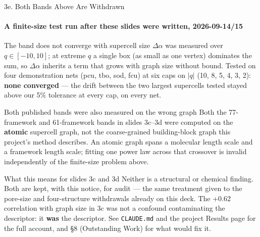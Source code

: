 \documentclass[aspectratio=169, 11pt]{beamer}
\begin{document}
\begin{frame}{3e. Both Bands Above Are Withdrawn}
\framesubtitle{A finite-size test run after these slides were written, 2026-09-14/15}
\begin{block}{\footnotesize The band does not converge with supercell size}
\scriptsize
$\Delta\alpha$ was measured over $q\in[-10,10]$; at extreme $q$ a single box (as small as one
vertex) dominates the sum, so $\Delta\alpha$ inherits a term that grows with graph size without
bound. Tested on four demonstration nets (pcu, tbo, sod, fcu) at six caps on $|q|$
(10, 8, 5, 4, 3, 2): \textbf{none converged} --- the drift between the two largest supercells
tested stayed above our 5\% tolerance at every cap, on every net.
\end{block}
\begin{block}{\footnotesize Both published bands were also measured on the wrong graph}
\scriptsize
Both the 77-framework and 61-framework bands in slides 3c--3d were computed on the
\textbf{atomic} supercell graph, not the coarse-grained building-block graph this project's
method describes. An atomic graph spans a molecular length scale and a framework length scale;
fitting one power law across that crossover is invalid independently of the finite-size problem
above.
\end{block}
\begin{block}{\footnotesize What this means for slides 3c and 3d}
\scriptsize
Neither is a structural or chemical finding. Both are kept, with this notice, for audit ---
the same treatment given to the pore-size and four-structure withdrawals already on this deck.
The +0.62 correlation with graph size in 3c was not a confound contaminating the descriptor:
it \textbf{was} the descriptor. See \texttt{CLAUDE.md} and the project Results page for the
full account, and \S 8 (Outstanding Work) for what would fix it.
\end{block}
\end{frame}

\end{document}
